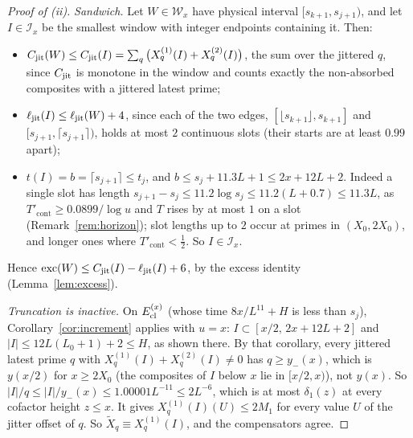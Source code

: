 \begin{proof}[Proof of (ii)]
\emph{Sandwich.} Let $W\in\mathcal W_x$ have physical interval $[s_{k+1},s_{j+1})$, and let $I\in\mathcal I_x$ be the smallest
window with integer endpoints containing it. Then:
\begin{itemize}
\item $C_{\mathrm{jit}}(W)\le C_{\mathrm{jit}}(I)=\sum_q\big(X^{(1)}_q(I)+X^{(2)}_q(I)\big)$, the sum over the jittered $q$, since $C_{\mathrm{jit}}$ is
  monotone in the window and counts exactly the non-absorbed composites with a jittered latest prime;
\item $\ell_{\mathrm{jit}}(I)\le\ell_{\mathrm{jit}}(W)+4$, since each of the two edges, $[\lfloor s_{k+1}\rfloor,s_{k+1}]$ and $[s_{j+1},\lceil s_{j+1}\rceil)$, holds at most $2$
  continuous slots (their starts are at least $0.99$ apart);
\item $t(I)=b=\lceil s_{j+1}\rceil\le t_j$, and $b\le s_j+11.3L+1\le2x+12L+2$. Indeed a single slot has length
  $s_{j+1}-s_j\le11.2\log s_j\le11.2(L+0.7)\le11.3L$, as $T'_{\mathrm{cont}}\ge0.0899/\log u$ and $T$ rises by at most $1$ on a slot
  (Remark~\ref{rem:horizon}); slot lengths up to $2$ occur at primes in $(X_0,2X_0)$, and longer ones where $T'_{\mathrm{cont}}<\tfrac12$.
  So $I\in\mathcal I_x$.
\end{itemize}
Hence $\operatorname{exc}(W)\le C_{\mathrm{jit}}(I)-\ell_{\mathrm{jit}}(I)+6$, by the excess identity (Lemma~\ref{lem:excess}).

\emph{Truncation is inactive.} On $E_{\mathrm{cl}}^{(x)}$ (whose time $8x/L^{11}+H$ is less than $s_j$), Corollary~\ref{cor:increment}
applies with $u=x$: $I\subset[x/2,\,2x+12L+2]$ and $|I|\le12L(L_0+1)+2\le H$, as shown there. By that corollary, every
jittered latest prime $q$ with $X^{(1)}_q(I)+X^{(2)}_q(I)\ne0$ has $q\ge y_-(x)$, which is $y(x/2)$ for $x\ge2X_0$ (the composites
of $I$ below $x$ lie in $[x/2,x)$), not $y(x)$. So $|I|/q\le|I|/y_-(x)\le1.00001L^{-11}\le2L^{-6}$, which is at most
$\delta_1(z)$ at every cofactor height $z\le x$. It gives $X^{(1)}_q(I)(U)\le2M_1$ for every value $U$ of the
jitter offset of $q$. So $\tilde X_q\equiv X^{(1)}_q(I)$, and the compensators agree.


\end{proof}
